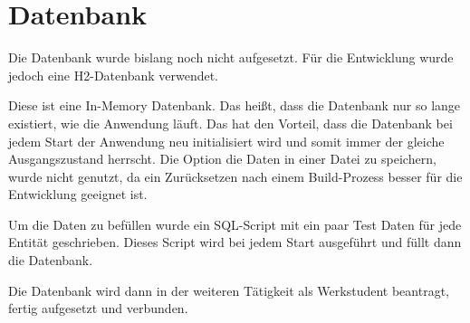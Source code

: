 \section{Datenbank}
Die Datenbank wurde bislang noch nicht aufgesetzt. Für die Entwicklung wurde jedoch eine H2-Datenbank verwendet. 

Diese ist eine In-Memory Datenbank. Das heißt, dass die Datenbank nur so lange existiert, wie die Anwendung läuft.
Das hat den Vorteil, dass die Datenbank bei jedem Start der Anwendung neu initialisiert wird und somit immer der gleiche Ausgangszustand herrscht.
Die Option die Daten in einer Datei zu speichern, wurde nicht genutzt, da ein Zurücksetzen nach einem Build-Prozess besser für die Entwicklung geeignet ist.

Um die Daten zu befüllen wurde ein SQL-Script mit ein paar Test Daten für jede Entität geschrieben. Dieses Script wird bei jedem Start ausgeführt und
füllt dann die Datenbank.

Die Datenbank wird dann in der weiteren Tätigkeit als Werkstudent beantragt, fertig aufgesetzt und verbunden.
\
